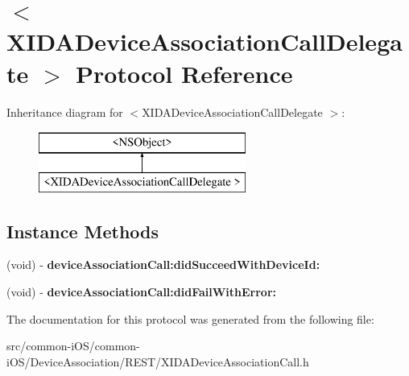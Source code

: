 \hypertarget{protocol_x_i_d_a_device_association_call_delegate_01-p}{}\section{$<$X\+I\+D\+A\+Device\+Association\+Call\+Delegate $>$ Protocol Reference}
\label{protocol_x_i_d_a_device_association_call_delegate_01-p}
Inheritance diagram for $<$X\+I\+D\+A\+Device\+Association\+Call\+Delegate $>$\+:\begin{figure}[H]
\begin{center}
\leavevmode
\includegraphics[height=2.000000cm]{protocol_x_i_d_a_device_association_call_delegate_01-p}
\end{center}
\end{figure}
\subsection*{Instance Methods}
\begin{DoxyCompactItemize}
\item 
\hypertarget{protocol_x_i_d_a_device_association_call_delegate_01-p_ada75bdef46f3946d4fb27c348688da59}{}\label{protocol_x_i_d_a_device_association_call_delegate_01-p_ada75bdef46f3946d4fb27c348688da59} 
(void) -\/ {\bfseries device\+Association\+Call\+:did\+Succeed\+With\+Device\+Id\+:}
\item 
\hypertarget{protocol_x_i_d_a_device_association_call_delegate_01-p_a6d9e24014501ac898a50c38b8418ad08}{}\label{protocol_x_i_d_a_device_association_call_delegate_01-p_a6d9e24014501ac898a50c38b8418ad08} 
(void) -\/ {\bfseries device\+Association\+Call\+:did\+Fail\+With\+Error\+:}
\end{DoxyCompactItemize}


The documentation for this protocol was generated from the following file\+:\begin{DoxyCompactItemize}
\item 
src/common-\/i\+O\+S/common-\/i\+O\+S/\+Device\+Association/\+R\+E\+S\+T/X\+I\+D\+A\+Device\+Association\+Call.\+h\end{DoxyCompactItemize}
